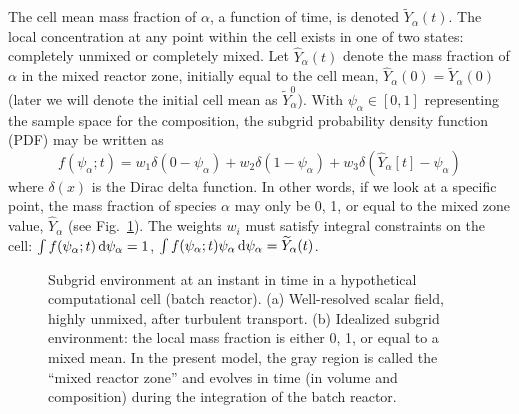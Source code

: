 The cell mean mass fraction of $\alpha$, a function of time, is denoted $\widetilde{Y}_\alpha(t)$. The local concentration at any point within the cell exists in one of two states: completely unmixed or completely mixed.  Let $\hat{Y}_\alpha(t)$ denote the mass fraction of $\alpha$ in the mixed reactor zone, initially equal to the cell mean, $\hat{Y}_\alpha(0) = \widetilde{Y}_{\alpha}(0)$ (later we will denote the initial cell mean as $\widetilde{Y}_{\alpha}^0$).  With $\psi_\alpha \in [0,1]$ representing the sample space for the composition, the subgrid probability density function (PDF) may be written as
\begin{equation}
\label{eq:pdf}
f(\psi_\alpha;t) = w_1 \delta(0-\psi_\alpha) + w_2 \delta(1-\psi_\alpha) + w_3 \delta(\hat{Y}_\alpha[t] - \psi_\alpha)
\end{equation}
where $\delta(x)$ is the Dirac delta function.  In other words, if we look at a specific point, the mass fraction of species $\alpha$ may only be 0, 1, or equal to the mixed zone value, $\hat{Y}_\alpha$ (see Fig.~\ref{fig_subgrid_environment}).  The weights $w_i$ must satisfy integral constraints on the cell: $\int f(\psi_\alpha;t) \,\mathrm{d} \psi_\alpha = 1$, $\int f(\psi_\alpha;t) \psi_\alpha \,\mathrm{d} \psi_\alpha = \widetilde{Y}_\alpha(t)$.

\begin{figure}
\begin{center}
\end{center}
\caption[Idealized subgrid environment for batch reactor model]{Subgrid environment at an instant in time in a hypothetical computational cell (batch reactor). (a) Well-resolved scalar field, highly unmixed, after turbulent transport. (b) Idealized subgrid environment: the local mass fraction is either 0, 1, or equal to a mixed mean.  In the present model, the gray region is called the ``mixed reactor zone'' and evolves in time (in volume and composition) during the integration of the batch reactor.}
\label{fig_subgrid_environment}
\end{figure}


